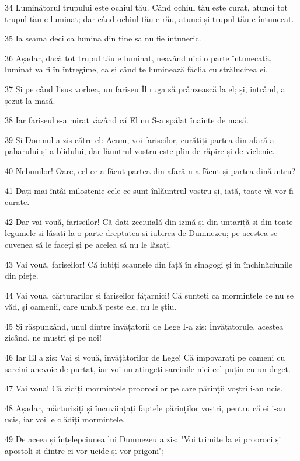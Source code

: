 \par 34 Luminătorul trupului este ochiul tău. Când ochiul tău este curat, atunci tot trupul tău e luminat; dar când ochiul tău e rău, atunci și trupul tău e întunecat.
\par 35 Ia seama deci ca lumina din tine să nu fie întuneric.
\par 36 Așadar, dacă tot trupul tău e luminat, neavând nici o parte întunecată, luminat va fi în întregime, ca și când te luminează făclia cu strălucirea ei.
\par 37 Și pe când Iisus vorbea, un fariseu Îl ruga să prânzească la el; și, intrând, a șezut la masă.
\par 38 Iar fariseul s-a mirat văzând că El nu S-a spălat înainte de masă.
\par 39 Și Domnul a zis către el: Acum, voi fariseilor, curățiți partea din afară a paharului și a blidului, dar lăuntrul vostru este plin de răpire și de viclenie.
\par 40 Nebunilor! Oare, cel ce a făcut partea din afară n-a făcut și partea dinăuntru?
\par 41 Dați mai întâi milostenie cele ce sunt înlăuntrul vostru și, iată, toate vă vor fi curate.
\par 42 Dar vai vouă, fariseilor! Că dați zeciuială din izmă și din untariță și din toate legumele și lăsați la o parte dreptatea și iubirea de Dumnezeu; pe acestea se cuvenea să le faceți și pe acelea să nu le lăsați.
\par 43 Vai vouă, fariseilor! Că iubiți scaunele din față în sinagogi și în închinăciunile din piețe.
\par 44 Vai vouă, cărturarilor și fariseilor fățarnici! Că sunteți ca mormintele ce nu se văd, și oamenii, care umblă peste ele, nu le știu.
\par 45 Și răspunzând, unul dintre învățătorii de Lege I-a zis: Învățătorule, acestea zicând, ne mustri și pe noi!
\par 46 Iar El a zis: Vai și vouă, învățătorilor de Lege! Că împovărați pe oameni cu sarcini anevoie de purtat, iar voi nu atingeți sarcinile nici cel puțin cu un deget.
\par 47 Vai vouă! Că zidiți mormintele proorocilor pe care părinții voștri i-au ucis.
\par 48 Așadar, mărturisiți și încuviințați faptele părinților voștri, pentru că ei i-au ucis, iar voi le clădiți mormintele.
\par 49 De aceea și înțelepciunea lui Dumnezeu a zis: "Voi trimite la ei prooroci și apostoli și dintre ei vor ucide și vor prigoni";
